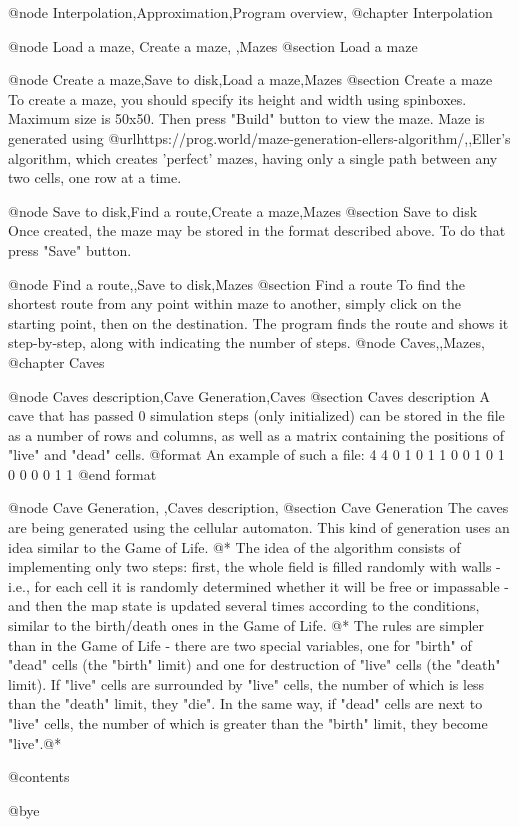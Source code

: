 @node Interpolation,Approximation,Program overview,
@chapter Interpolation

@node Load a maze, Create a maze, ,Mazes
@section Load a maze


@node Create a maze,Save to disk,Load a maze,Mazes
@section Create a maze
To create a maze, you should specify its height and width using spinboxes. Maximum size is 50x50.
Then press "Build" button to view the maze.
Maze is generated using @url{https://prog.world/maze-generation-ellers-algorithm/,,Eller's algorithm}, 
which creates 'perfect' mazes, having only a single path between any two cells, one row at a time.

@node Save to disk,Find a route,Create a maze,Mazes
@section Save to disk
Once created, the maze may be stored in the format described above. To do that press "Save" button.

@node Find a route,,Save to disk,Mazes
@section Find a route
To find the shortest route from any point within maze to another, simply click on the starting point, 
then on the destination. The program finds the route and shows it step-by-step, along with indicating
the number of steps.
@node Caves,,Mazes,
@chapter Caves

@node Caves description,Cave Generation,Caves
@section Caves description
A cave that has passed 0 simulation steps (only initialized) can be stored in the file as a number 
of rows and columns, as well as a matrix containing the positions of "live" and "dead" cells.
@format
An example of such a file:
4 4
0 1 0 1
1 0 0 1
0 1 0 0
0 0 1 1
@end format

@node Cave Generation, ,Caves description,
@section Cave Generation
The caves are being generated using the cellular automaton. 
This kind of generation uses an idea similar to the Game of Life. @*
The idea of the algorithm consists of implementing only two steps: 
first, the whole field is filled randomly with walls - i.e., for each cell 
it is randomly determined whether it will be free or impassable - 
and then the map state is updated several times according to the conditions, 
similar to the birth/death ones in the Game of Life. @*
The rules are simpler than in the Game of Life - 
there are two special variables, one for "birth" of "dead" cells (the "birth" limit) 
and one for destruction of "live" cells (the "death" limit).
If "live" cells are surrounded by "live" cells, the number of which is less than the "death" limit, 
they "die". In the same way, if "dead" cells are next to "live" cells, the number of which is greater 
than the "birth" limit, they become "live".@*

@contents

@bye